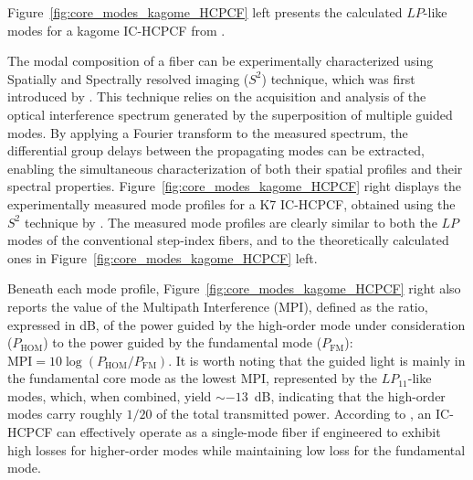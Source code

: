Figure~\ref{fig:core_modes_kagome_HCPCF} left presents the calculated $LP$-like modes for a kagome IC-HCPCF from \cite{Debord-Vincetti:19}.

The modal composition of a fiber can be experimentally characterized using Spatially and Spectrally resolved imaging ($S^2$) technique, which was first introduced by \citeauthor{Nicholson_S2:08} \cite{Nicholson_S2:08}. This technique relies on the acquisition and analysis of the optical interference spectrum generated by the superposition of multiple guided modes. By applying a Fourier transform to the measured spectrum, the differential group delays between the propagating modes can be extracted, enabling the simultaneous characterization of both their spatial profiles and their spectral properties. Figure~\ref{fig:core_modes_kagome_HCPCF} right displays the experimentally measured mode profiles for a K7 IC-HCPCF, obtained using the $S^2$ technique by \citeauthor{Bradley:16} \cite{Bradley:16}. The measured mode profiles are clearly similar to both the $LP$ modes of the conventional step-index fibers, and to the theoretically calculated ones in Figure~\ref{fig:core_modes_kagome_HCPCF} left.

Beneath each mode profile, Figure~\ref{fig:core_modes_kagome_HCPCF} right also reports the value of the Multipath Interference (MPI), defined as the ratio, expressed in dB, of the power guided by the high-order mode under consideration ($P_\text{HOM}$) to the power guided by the fundamental mode ($P_\text{FM}$): $\text{MPI}=10\log(P_\text{HOM}/P_\text{FM})$. It is worth noting that the guided light is mainly in the fundamental core mode as the lowest MPI, represented by the $LP_{11}$-like modes, which, when combined, yield $\sim -13$~dB, indicating that the high-order modes carry roughly $1/20$ of the total transmitted power. According to \cite{Debord-Vincetti:19}, an IC-HCPCF can effectively operate as a single-mode fiber if engineered to exhibit high losses for higher-order modes while maintaining low loss for the fundamental mode.